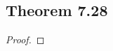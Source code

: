 \documentclass[../../main.tex]{subfiles}
\begin{document}
\subsection{Theorem 7.28}
\begin{wts}

\end{wts}
\begin{proof}

\end{proof}
\end{document}
